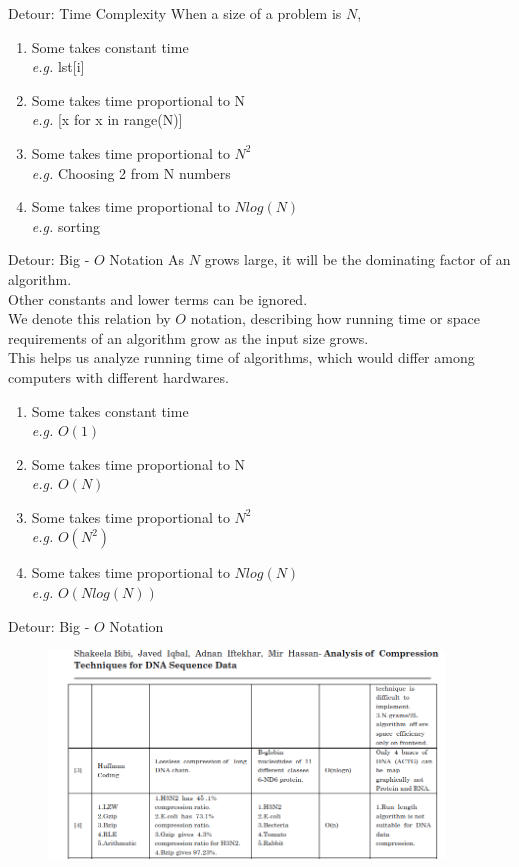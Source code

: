 \documentclass{beamer}
\begin{document}
\begin{frame}{Detour: Time Complexity}
  When a size of a problem is $N$,\\
  \begin{enumerate}
    \item Some takes constant time\\
      \textit{e.g.} lst[i]
    \item Some takes time proportional to N\\
      \textit{e.g.} [x for x in range(N)]
    \item Some takes time proportional to $N^2$\\
      \textit{e.g.} Choosing 2 from N numbers
    \item Some takes time proportional to $Nlog(N)$\\
      \textit{e.g.} sorting
  \end{enumerate}
\end{frame}


\begin{frame}{Detour: Big - $O$ Notation}
  As $N$ grows large, it will be the dominating factor of an algorithm.\\
  Other constants and lower terms can be ignored.\\
  We denote this relation by $O$ notation, describing how running time or space
  requirements of an algorithm grow as the input size grows.\\
  This helps us analyze running time of algorithms, which would differ among
  computers with different hardwares.
  \begin{enumerate}
    \item Some takes constant time\\
      \textit{e.g.} $O(1)$
    \item Some takes time proportional to N\\
      \textit{e.g.} $O(N)$
    \item Some takes time proportional to $N^2$\\
      \textit{e.g.} $O(N^2)$
    \item Some takes time proportional to $Nlog(N)$\\
      \textit{e.g.} $O(Nlog(N))$
  \end{enumerate}
\end{frame}

\begin{frame}{Detour: Big - $O$ Notation}
  \begin{figure}[h]
    \centering
    \includegraphics[width=105mm]{./bigOexample.png}
  \end{figure}
\end{frame}
\end{document}
